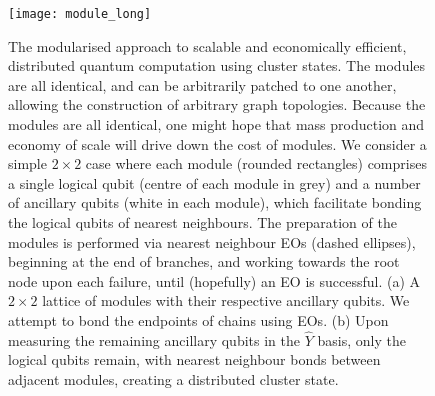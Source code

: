 \pubmode
\begin{figure}[!htbp]
\texttt{[image: module\_long]}
\captionspacefig \caption{The modularised approach to scalable and economically efficient, distributed quantum computation using cluster states. The modules are all identical, and can be arbitrarily patched to one another, allowing the construction of arbitrary graph topologies. Because the modules are all identical, one might hope that mass production and economy of scale will drive down the cost of modules. We consider a simple \mbox{$2\times 2$} case where each module (rounded rectangles) comprises a single logical qubit (centre of each module in grey) and a number of ancillary qubits (white in each module), which facilitate bonding the logical qubits of nearest neighbours. The preparation of the modules is performed via nearest neighbour EOs (dashed ellipses), beginning at the end of branches, and working towards the root node upon each failure, until (hopefully) an EO is successful. (a) A \mbox{$2\times 2$} lattice of modules with their respective ancillary qubits. We attempt to bond the endpoints of chains using EOs. (b) Upon measuring the remaining ancillary qubits in the $\hat{Y}$ basis, only the logical qubits remain, with nearest neighbour bonds between adjacent modules, creating a distributed cluster state.} \label{fig:module}
\end{figure}
\else
